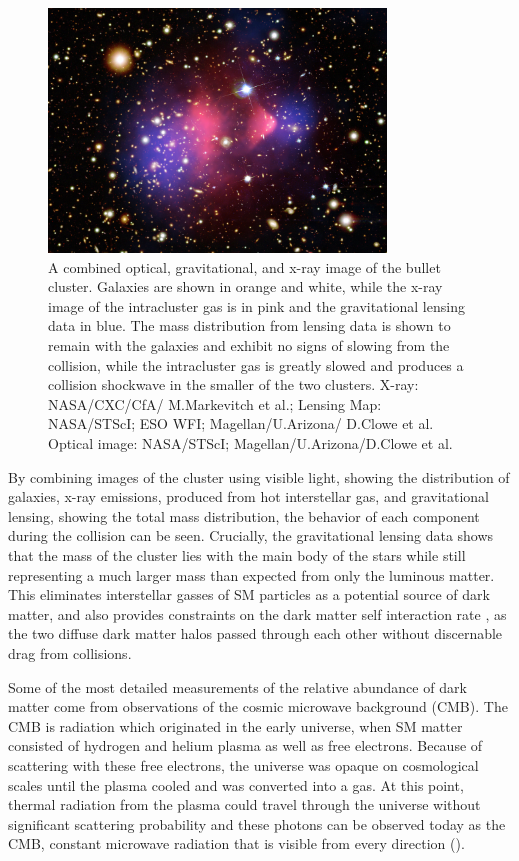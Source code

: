 \begin{figure}[htpb]
	\label{fig:bullet}
	\centering
	\includegraphics[width=0.8\textwidth]{figures/bullet_cluster.jpg}
	\caption[Visible, x-ray, and gravitational lensing images of the bullet cluster]{ A combined optical, gravitational, and x-ray image of the bullet cluster. Galaxies are shown in orange and white, while the x-ray image of the intracluster gas is in pink and the gravitational lensing data in blue. The mass distribution from lensing data is shown to remain with the galaxies and exhibit no signs of slowing from the collision, while the intracluster gas is greatly slowed and produces a collision shockwave in the smaller of the two clusters. X-ray: NASA/CXC/CfA/ M.Markevitch et al.; Lensing Map: NASA/STScI; ESO WFI; Magellan/U.Arizona/ D.Clowe et al. Optical image: NASA/STScI; Magellan/U.Arizona/D.Clowe et al.}
\end{figure}

By combining images of the cluster using visible light, showing the distribution of galaxies, x-ray emissions, produced from hot interstellar gas, and gravitational lensing, showing the total mass distribution, the behavior of each component during the collision can be seen. 
Crucially, the gravitational lensing data shows that the mass of the cluster lies with the main body of the stars while still representing a much larger mass than expected from only the luminous matter. 
This eliminates interstellar gasses of SM particles as a potential source of dark matter, and also provides constraints on the dark matter self interaction rate \cite{Randall_2008}, as the two diffuse dark matter halos passed through each other without discernable drag from collisions.

Some of the most detailed measurements of the relative abundance of dark matter come from observations of the cosmic microwave background (CMB).
The CMB is radiation which originated in the early universe, when SM matter consisted of hydrogen and helium plasma as well as free electrons.
Because of scattering with these free electrons, the universe was opaque on cosmological scales until the plasma cooled and was converted into a gas. 
At this point, thermal radiation from the plasma could travel through the universe without significant scattering probability and these photons can be observed today as the CMB, constant microwave radiation that is visible from every direction ().

